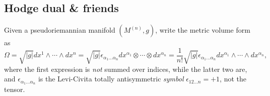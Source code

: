 \subsection{Hodge dual \& friends} 

\begin{mytheorem}
%
Given a pseudoriemannian manifold \((M^{(n)}, g)\), write the metric volume form as
\begin{equation}
    \Omega = \sqrt{|g|}dx^1 \wedge \cdots \wedge dx^n 
    = \sqrt{|g|} \epsilon_{\alpha_1 \dots \alpha_n} dx^{\alpha_1} \otimes \cdots \otimes dx^{\alpha_n}
    = \frac{1}{n!} \sqrt{|g|} \epsilon_{\alpha_1 \dots \alpha_n} dx^{\alpha_1} \wedge \cdots \wedge dx^{\alpha_n},
\end{equation}
where the first expression is \emph{not} summed over indices, while the latter two are, and $\epsilon_{\alpha_1 \dots \alpha_n}$ is the Levi-Civita totally antisymmetric \emph{symbol} $\epsilon_{1 2 \dots n} = +1$, not the tensor.


\end{mytheorem}
